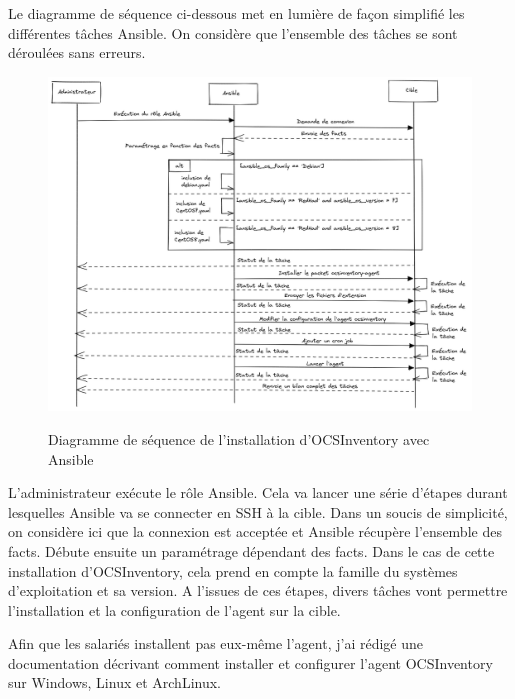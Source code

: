 \documentclass[12pt]{article}
\begin{document}
\newpage
Le diagramme de séquence ci-dessous met en lumière de façon simplifié les différentes tâches \gls{Ansible}. 
On considère que l'ensemble des tâches se sont déroulées sans erreurs.

\begin{figure}[!ht]
    \centering
    \includegraphics[width=\textwidth]{src/graph_ansible_ocs.png}
    \label{fig:ansible_ocs}
    \caption{Diagramme de séquence de l'installation d'\gls{OCSInventory} avec \gls{Ansible}}
\end{figure}

L'administrateur exécute le rôle \gls{Ansible}.
Cela va lancer une série d'étapes durant lesquelles \gls{Ansible} va se connecter en SSH à la cible.
Dans un soucis de simplicité, on considère ici que la connexion est acceptée et \gls{Ansible} récupère l'ensemble des facts.
Débute ensuite un paramétrage dépendant des facts. 
Dans le cas de cette installation d'\gls{OCSInventory}, cela prend en compte la famille du systèmes d'exploitation et sa version.
A l'issues de ces étapes, divers tâches vont permettre l'installation et la configuration de l'agent sur la cible.

Afin que les salariés installent pas eux-même l'agent, j'ai rédigé une documentation décrivant comment installer et configurer l'agent \gls{OCSInventory} sur Windows, \gls{Linux} et ArchLinux.
\end{document}
